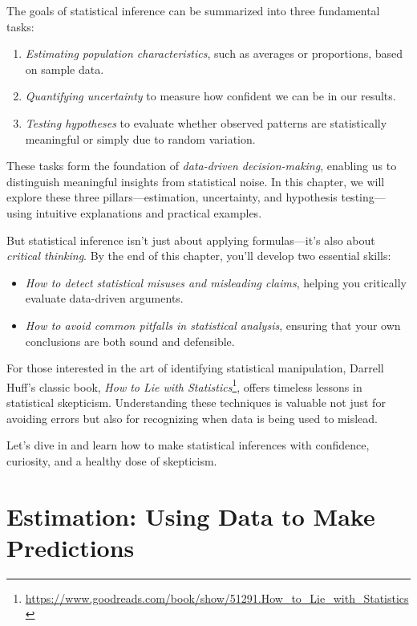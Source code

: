 \documentclass[
  11pt,
]{book}
\providecommand{\tightlist}{%
  \setlength{\itemsep}{0pt}\setlength{\parskip}{0pt}}
\renewcommand{\href}[2]{#2\footnote{\url{#1}}}
\theoremstyle{definition}
\theoremstyle{definition}
\theoremstyle{definition}
\theoremstyle{definition}
\theoremstyle{remark}
\begin{document}
The goals of statistical inference can be summarized into three fundamental tasks:

\begin{enumerate}
\def\labelenumi{\arabic{enumi}.}
\tightlist
\item
  \emph{Estimating population characteristics}, such as averages or proportions, based on sample data.\\
\item
  \emph{Quantifying uncertainty} to measure how confident we can be in our results.\\
\item
  \emph{Testing hypotheses} to evaluate whether observed patterns are statistically meaningful or simply due to random variation.
\end{enumerate}

These tasks form the foundation of \emph{data-driven decision-making}, enabling us to distinguish meaningful insights from statistical noise. In this chapter, we will explore these three pillars---estimation, uncertainty, and hypothesis testing---using intuitive explanations and practical examples.

But statistical inference isn't just about applying formulas---it's also about \emph{critical thinking}. By the end of this chapter, you'll develop two essential skills:

\begin{itemize}
\tightlist
\item
  \emph{How to detect statistical misuses and misleading claims}, helping you critically evaluate data-driven arguments.\\
\item
  \emph{How to avoid common pitfalls in statistical analysis}, ensuring that your own conclusions are both sound and defensible.
\end{itemize}

For those interested in the art of identifying statistical manipulation, Darrell Huff's classic book, \href{https://www.goodreads.com/book/show/51291.How_to_Lie_with_Statistics}{\emph{How to Lie with Statistics}}, offers timeless lessons in statistical skepticism. Understanding these techniques is valuable not just for avoiding errors but also for recognizing when data is being used to mislead.

Let's dive in and learn how to make statistical inferences with confidence, curiosity, and a healthy dose of skepticism.

\section{Estimation: Using Data to Make Predictions}\label{estimation-using-data-to-make-predictions}
\end{document}
